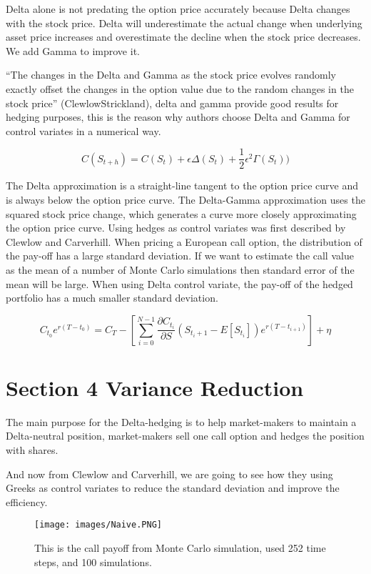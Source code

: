 \documentclass[11pt,]{article}
\makeatletter
\def\maxwidth{\ifdim\Gin@nat@width>\linewidth\linewidth
\else\Gin@nat@width\fi}
\let\Oldincludegraphics\includegraphics
\renewcommand{\includegraphics}[1]{\Oldincludegraphics[width=\maxwidth]{#1}}
\makeatother
\begin{document}
Delta alone is not predating the option price accurately because Delta
changes with the stock price. Delta will underestimate the actual change
when underlying asset price increases and overestimate the decline when
the stock price decreases. We add Gamma to improve it.

``The changes in the Delta and Gamma as the stock price evolves randomly
exactly offset the changes in the option value due to the random changes
in the stock price'' (ClewlowStrickland), delta and gamma provide good
results for hedging purposes, this is the reason why authors choose
Delta and Gamma for control variates in a numerical way.

\[
C(S_{t+h} )= C(S_t) + \epsilon \Delta(S_t) + \frac{1}{2}\epsilon^2\Gamma(S_t))
\]

The Delta approximation is a straight-line tangent to the option price
curve and is always below the option price curve. The Delta-Gamma
approximation uses the squared stock price change, which generates a
curve more closely approximating the option price curve. Using hedges as
control variates was first described by Clewlow and Carverhill. When
pricing a European call option, the distribution of the pay-off has a
large standard deviation. If we want to estimate the call value as the
mean of a number of Monte Carlo simulations then standard error of the
mean will be large. When using Delta control variate, the pay-off of the
hedged portfolio has a much smaller standard deviation.

\[
C_{t_0}e^{r(T-t_0)} = C_T - [\sum^{N-1}_{i=0}\frac{\partial C_{t_i}}{\partial S}(S_{t{_i+1}} - E[S_{t_i}])e^{r(T-t_{i+1})}] + \eta
\]

\section{Section 4 Variance
Reduction}\label{section-4-variance-reduction}

The main purpose for the Delta-hedging is to help market-makers to
maintain a Delta-neutral position, market-makers sell one call option
and hedges the position with shares.

And now from Clewlow and Carverhill, we are going to see how they using
Greeks as control variates to reduce the standard deviation and improve
the efficiency.

\begin{figure}
\centering
\texttt{[image: images/Naive.PNG]}
\caption{This is the call payoff from Monte Carlo simulation, used 252
time steps, and 100 simulations.}
\end{figure}
\end{document}
